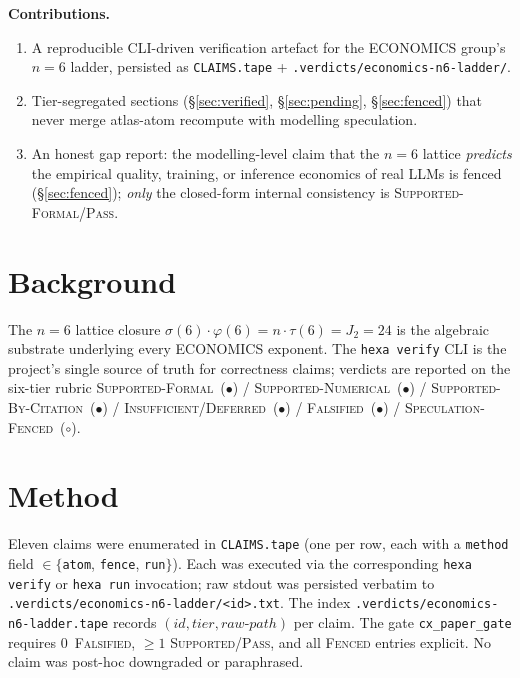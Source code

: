 \documentclass[11pt,a4paper]{article}
\begin{document}
\medskip
\noindent\textbf{Contributions.}
\begin{enumerate}\itemsep0.3em
\item A reproducible CLI-driven verification artefact for the
      ECONOMICS group's $n=6$ ladder, persisted as
      \texttt{CLAIMS.tape} + \texttt{.verdicts/economics-n6-ladder/}.
\item Tier-segregated sections (\S\ref{sec:verified},
      \S\ref{sec:pending}, \S\ref{sec:fenced}) that never merge
      atlas-atom recompute with modelling speculation.
\item An honest gap report: the modelling-level claim that the
      $n=6$ lattice \emph{predicts} the empirical quality, training,
      or inference economics of real LLMs is fenced
      (\S\ref{sec:fenced}); \emph{only} the closed-form internal
      consistency is \textsc{Supported-Formal}/\textsc{Pass}.
\end{enumerate}

\section{Background}
\label{sec:bg}

The $n=6$ lattice closure $\sigma(6) \cdot \varphi(6) = n \cdot \tau(6)
= J_2 = 24$ \cite{hoffmann2022chinchilla,kaplan2020scaling} is the
algebraic substrate underlying every ECONOMICS exponent. The
\texttt{hexa verify} CLI \cite{hexacodex2026} is the project's
single source of truth for correctness claims; verdicts are reported
on the six-tier rubric \textsc{Supported-Formal}~\textcolor{blue!60!black}{($\bullet$)} /
\textsc{Supported-Numerical}~\textcolor{green!50!black}{($\bullet$)} /
\textsc{Supported-By-Citation}~\textcolor{yellow!60!black}{($\bullet$)} /
\textsc{Insufficient/Deferred}~\textcolor{orange!80!black}{($\bullet$)} /
\textsc{Falsified}~\textcolor{red!70!black}{($\bullet$)} /
\textsc{Speculation-Fenced}~($\circ$).

\section{Method}
\label{sec:method}

Eleven claims were enumerated in \texttt{CLAIMS.tape} (one per row,
each with a \texttt{method} field $\in \{$\texttt{atom}, \texttt{fence},
\texttt{run}$\}$). Each was executed via the corresponding
\texttt{hexa verify} or \texttt{hexa run} invocation; raw stdout was
persisted verbatim to \texttt{.verdicts/economics-n6-ladder/<id>.txt}.
The index \texttt{.verdicts/economics-n6-ladder.tape} records
$(id, tier, raw\text{-}path)$ per claim. The gate
\texttt{cx\_paper\_gate} requires $0$~\textsc{Falsified}, $\ge 1$
\textsc{Supported}/\textsc{Pass}, and all \textsc{Fenced} entries
explicit. No claim was post-hoc downgraded or paraphrased.
\end{document}
